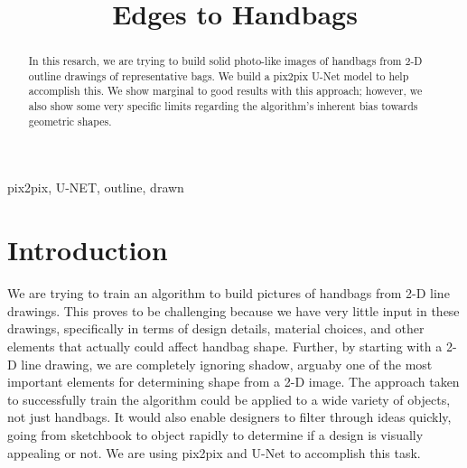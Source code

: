 \documentclass[conference]{IEEEtran}
\begin{document}
\title{Edges to Handbags}

\author{
\and
{}
}

\maketitle

\begin{abstract}
In this resarch, we are trying to build solid photo-like images of handbags from 2-D outline drawings of representative bags.
We build a pix2pix U-Net model to help accomplish this. We show
marginal to good results with this approach; however, we also show some very specific limits regarding the algorithm's inherent bias towards geometric shapes.
\end{abstract}

\begin{IEEEkeywords}
pix2pix, U-NET, outline, drawn
\end{IEEEkeywords}

\section{Introduction}
We are trying to train an algorithm to build pictures of handbags from 2-D line drawings. This proves to be challenging because we have very little input in these drawings, specifically in terms of design details, material choices, and other elements that actually could affect handbag shape. Further, by starting with a 2-D line drawing, we are completely ignoring shadow, arguaby one of the most important elements for determining shape from a 2-D image. The approach taken to successfully train the algorithm could be applied to a wide variety of objects, not just handbags. It would also enable designers to filter through ideas quickly, going from sketchbook to object rapidly to determine if a design is visually appealing or not. We are using pix2pix and U-Net to accomplish this task.
\end{document}
